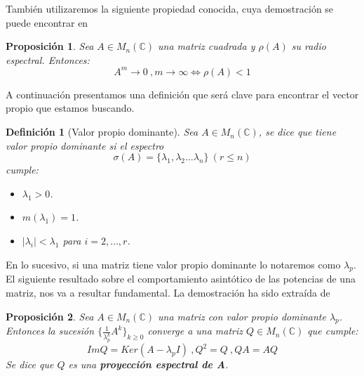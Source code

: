 \documentclass[size=a4, parskip=half, titlepage=false, toc=flat, toc=bib, 12pt, twoside]{scrartcl}
\theoremstyle{theorem-style}
\newtheorem{nprop}{Proposición}[section]
\theoremstyle{definition-style}
\newtheorem{ndef}{Definición}[section]
\theoremstyle{remark-style}
\theoremstyle{example-style}
\theoremstyle{definition-style}
\theoremstyle{remark-style}
\begin{document}
También utilizaremos la siguiente propiedad conocida, cuya demostración se puede encontrar en \cite{modelos}

\begin{nprop}
\label{res1}
Sea $A \in M_n(\mathbb{C})$ una matriz cuadrada y $\rho(A)$ su radio espectral. Entonces:
$$A^m \rightarrow 0 \ ,  m \rightarrow \infty \Leftrightarrow \rho(A) < 1 $$
\end{nprop}


A continuación presentamos una definición que será clave para encontrar el vector propio que estamos buscando.

\begin{ndef}[Valor propio dominante]
Sea $A \in M_n(\mathbb{C})$, se dice que tiene valor propio dominante si el espectro
$$\sigma (A) = \{ \lambda_1, \lambda_2 \dots \lambda_n \} \   (r \leq n)$$
cumple:
\begin{itemize}
\item $\lambda_1 > 0$.
\item $m(\lambda_1) = 1$.
\item $|\lambda_i| < \lambda_1$ para $i = 2, \dots , r$.
\end{itemize}
\end{ndef}
En lo sucesivo, si una matriz tiene valor propio dominante lo notaremos como $\lambda_p$. El siguiente resultado sobre el comportamiento asintótico de las potencias de una matriz, nos va a resultar fundamental. La demostración ha sido extraída de \cite{modelos}

\begin{nprop} Sea $A \in M_n(\mathbb{C})$ una matriz con valor propio dominante $\lambda_p$. Entonces la sucesión $\{\frac{1}{ \lambda_p^k } A^k \}_{k\geq 0}$ converge a una matriz $Q \in M_n(\mathbb{C})$ que cumple:
$$ImQ = Ker ( A - \lambda_p I) \ , Q^2 = Q \ , QA = AQ $$
Se dice que $Q$ es una \textbf{proyección espectral de A}.
\label{converge}
\end{nprop}
\end{document}
